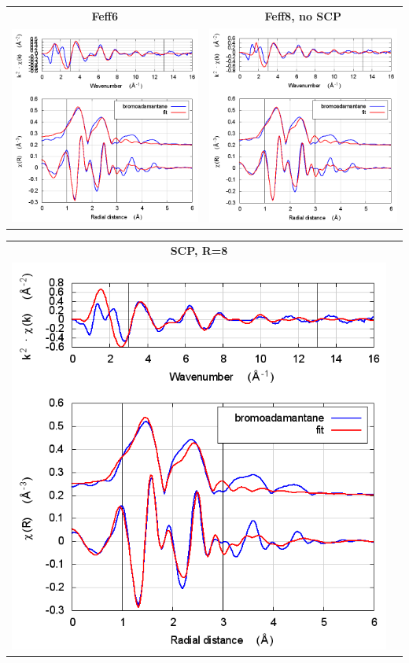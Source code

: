 \documentclass[11pt]{article}
\begin{document}
\begin{center}
  \begin{tabular}{cc}
    \textbf{Feff6} & \textbf{Feff8, no SCP} \\ 
    \includegraphics[width=.45\linewidth]{bromoadamantane/scf/fit_feff6.png} & 
    \includegraphics[width=.45\linewidth]{bromoadamantane/scf/fit_noSCF.png} \\
  \end{tabular}
\end{center}
\begin{center}
  \begin{tabular}{cc}
    \textbf{SCP, R=8}&\\
    \includegraphics[width=.45\linewidth]{bromoadamantane/scf/fit_withSCF_8.png}&\\
  \end{tabular}
\end{center}
\end{document}
